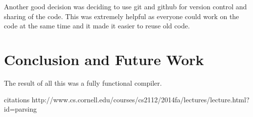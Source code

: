 \documentclass[12pt, oneside]{article}   	%
\begin{document}
Another good decision was deciding to use git and github for version control and sharing of the code. This was extremely helpful as everyone could work on the code at the same time and it made it easier to reuse old code.
\section{Conclusion and Future Work}
The result of all this was a fully functional compiler. 

citations
http://www.cs.cornell.edu/courses/cs2112/2014fa/lectures/lecture.html?id=parsing
\end{document}
